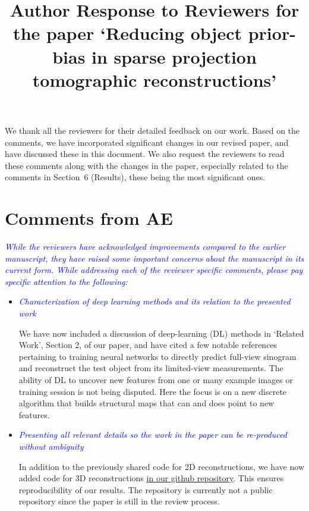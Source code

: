 \documentclass[11pt]{article}
\title{Author Response to Reviewers for the paper `Reducing object
  prior-bias in sparse projection tomographic reconstructions'}
\begin{document}
\date{}
\maketitle


We thank all the reviewers for their detailed feedback on our
work. Based on the comments, we have incorporated significant changes
in our revised paper, and have discussed these in this document. We
also request the reviewers to read these comments along with the
changes in the paper, especially related to the comments in Section~6
(Results), these being the most significant ones.


\section{Comments from AE}

\textcolor{blue}{\textit{While the reviewers have acknowledged
    improvements compared to the earlier manuscript, they have raised
    some important concerns about the manuscript in its current
    form. While addressing each of the reviewer specific comments,
    please pay specific attention to the following:}} 

  \begin{itemize}
  \item \textcolor{blue}{\textit{Characterization of deep learning
        methods and its relation to the presented work}} 

    We have now included a discussion of deep-learning (DL) methods in
    `Related Work', Section 2, of our paper, and have cited a few
    notable references pertaining to training neural networks to
    directly predict full-view sinogram and reconstruct the test
    object from its limited-view measurements. The ability of DL to
    uncover new features from one or many example images or training
    session is not being disputed. Here the focus is on a new discrete
    algorithm that builds structural maps that can and does point to
    new features.

    \item\textcolor{blue}{\textit{Presenting all relevant details so
          the work in the paper can be re-produced without ambiguity}} 
      

      In addition to the previously shared code for 2D
      reconstructions, we have now added code for 3D reconstructions
      \href{https://github.com/preetigopal/Weighted-Prior-Tomographic-Reconstruction}{in
        our github repository}. This ensures reproducibility of our
      results. The repository is currently not a public repository
      since the paper is still in the review process.

  \end{itemize}
\end{document}
